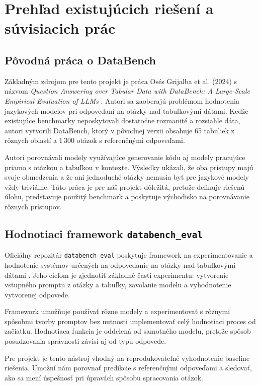 \section{Prehľad existujúcich riešení a súvisiacich prác}

\subsection{Pôvodná práca o DataBench}

Základným zdrojom pre tento projekt je práca Osés Grijalba et al. (2024) s názvom \emph{Question Answering over Tabular Data with DataBench: A Large-Scale Empirical Evaluation of LLMs} \cite{databench2024}. Autori sa zaoberajú problémom hodnotenia jazykových modelov pri odpovedaní na otázky nad tabuľkovými dátami. Keďže existujúce benchmarky neposkytovali dostatočne rozmanité a rozsiahle dáta, autori vytvorili DataBench, ktorý v pôvodnej verzii obsahuje 65 tabuliek z rôznych oblastí a 1\,300 otázok s referenčnými odpoveďami.

Autori porovnávali modely využívajúce generovanie kódu aj modely pracujúce priamo s otázkou a tabuľkou v kontexte. Výsledky ukázali, že oba prístupy majú svoje obmedzenia a že ani jednoduché otázky nemusia byť pre jazykové modely vždy triviálne. Táto práca je pre náš projekt dôležitá, pretože definuje riešenú úlohu, predstavuje použitý benchmark a poskytuje východisko na porovnávanie rôznych prístupov.

\subsection{Hodnotiaci framework \texttt{databench\_eval}}

Oficiálny repozitár \texttt{databench\_eval} poskytuje framework na experimentovanie a hodnotenie systémov určených na odpovedanie na otázky nad tabuľkovými dátami \cite{databencheval}. Jeho cieľom je zjednotiť základné časti experimentu: vytvorenie vstupného promptu z otázky a tabuľky, zavolanie modelu a vyhodnotenie vytvorenej odpovede.

Framework umožňuje používať rôzne modely a experimentovať s rôznymi spôsobmi tvorby promptov bez nutnosti implementovať celý hodnotiaci proces od začiatku. Hodnotiaca funkcia je oddelená od samotného modelu, pretože spôsob posudzovania správnosti závisí aj od typu odpovede.

Pre projekt je tento nástroj vhodný na reprodukovateľné vyhodnotenie baseline riešenia. Umožní nám porovnať predikcie s referenčnými odpoveďami a sledovať, ako sa mení úspešnosť pri úpravách spôsobu spracovania otázok.

